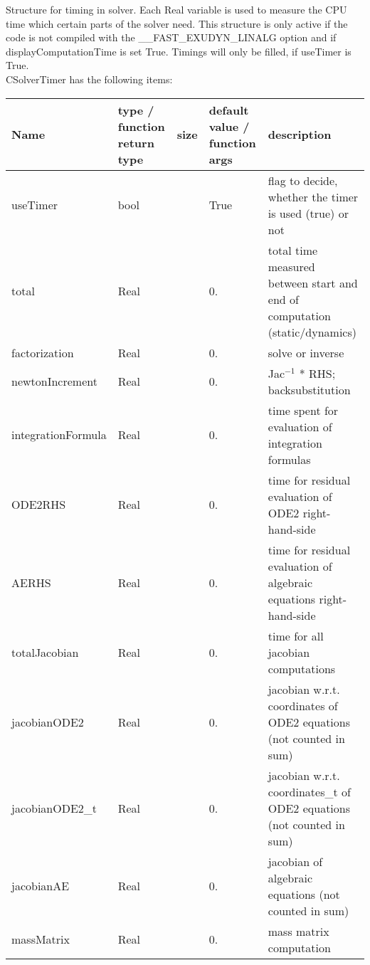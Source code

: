  \label{sec:CSolverTimer}
Structure for timing in solver. Each Real variable is used to measure the CPU time which certain parts of the solver need. This structure is only active if the code is not compiled with the \_\_FAST\_EXUDYN\_LINALG option and if displayComputationTime is set True. Timings will only be filled, if useTimer is True.\\ 
%
CSolverTimer has the following items:
\begin{center}
  \footnotesize
  \begin{longtable}{| p{4.2cm} | p{2.5cm} | p{0.3cm} | p{3.0cm} | p{6cm} |}
    \hline
    \bf Name & \bf type / function return type & \bf size & \bf default value / function args & \bf description \\ \hline
    useTimer &     bool &      &     True &     flag to decide, whether the timer is used (true) or not\\ \hline
    total &     Real &      &     0. &     total time measured between start and end of computation (static/dynamics)\\ \hline
    factorization &     Real &      &     0. &     solve or inverse\\ \hline
    newtonIncrement &     Real &      &     0. &     Jac$^{-1}$ * RHS; backsubstitution\\ \hline
    integrationFormula &     Real &      &     0. &     time spent for evaluation of integration formulas\\ \hline
    ODE2RHS &     Real &      &     0. &     time for residual evaluation of ODE2 right-hand-side\\ \hline
    AERHS &     Real &      &     0. &     time for residual evaluation of algebraic equations right-hand-side\\ \hline
    totalJacobian &     Real &      &     0. &     time for all jacobian computations\\ \hline
    jacobianODE2 &     Real &      &     0. &     jacobian w.r.t. coordinates of ODE2 equations (not counted in sum)\\ \hline
    jacobianODE2\_t &     Real &      &     0. &     jacobian w.r.t. coordinates\_t of ODE2 equations (not counted in sum)\\ \hline
    jacobianAE &     Real &      &     0. &     jacobian of algebraic equations (not counted in sum)\\ \hline
    massMatrix &     Real &      &     0. &     mass matrix computation\\ \hline

\end{longtable}
\end{center}
